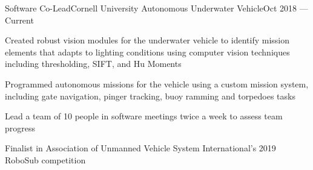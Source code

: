 \documentclass{resume}
\begin{document}
\begin{experience}
    \begin{entry}{Software Co-Lead}{Cornell University Autonomous Underwater
        Vehicle}{Oct 2018 --- Current}
        \begin{description}
            \item Created robust vision modules for the underwater vehicle to
                identify mission elements that adapts to lighting conditions
                using computer vision techniques including thresholding, SIFT,
                and Hu Moments
            \item Programmed autonomous missions for the vehicle using a custom
                mission system, including gate navigation, pinger tracking, buoy
                ramming and torpedoes tasks
            \item Lead a team of 10 people in software meetings twice a week to
                assess team progress
            \item Finalist in Association of Unmanned Vehicle System
                International's 2019 RoboSub competition
        \end{description}
    \end{entry}




\end{experience}
\end{document}
